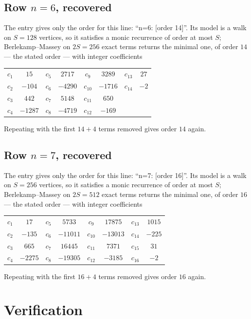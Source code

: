 \documentclass[11pt,a4paper]{article}
\theoremstyle{plain}
\theoremstyle{definition}
\begin{document}
\subsection*{Row $n=6$, recovered}
The entry gives only the order for this line: ``n=6: [order 14]''. Its model is a walk on
$S=128$ vertices, so it satisfies a monic recurrence of order at most $S$;
Berlekamp--Massey on $2S=256$ exact terms returns the minimal one, of order
$14$ --- the stated order --- with integer coefficients
\begin{center}\small\begin{tabular}{cccccccc}
$c_{1}$ & $15$ & $c_{5}$ & $2717$ & $c_{9}$ & $3289$ & $c_{13}$ & $27$ \\
$c_{2}$ & $-104$ & $c_{6}$ & $-4290$ & $c_{10}$ & $-1716$ & $c_{14}$ & $-2$ \\
$c_{3}$ & $442$ & $c_{7}$ & $5148$ & $c_{11}$ & $650$ &  &  \\
$c_{4}$ & $-1287$ & $c_{8}$ & $-4719$ & $c_{12}$ & $-169$ &  &  \\
\end{tabular}\end{center}
Repeating with the first $14+4$ terms removed gives order $14$ again.

\subsection*{Row $n=7$, recovered}
The entry gives only the order for this line: ``n=7: [order 16]''. Its model is a walk on
$S=256$ vertices, so it satisfies a monic recurrence of order at most $S$;
Berlekamp--Massey on $2S=512$ exact terms returns the minimal one, of order
$16$ --- the stated order --- with integer coefficients
\begin{center}\small\begin{tabular}{cccccccc}
$c_{1}$ & $17$ & $c_{5}$ & $5733$ & $c_{9}$ & $17875$ & $c_{13}$ & $1015$ \\
$c_{2}$ & $-135$ & $c_{6}$ & $-11011$ & $c_{10}$ & $-13013$ & $c_{14}$ & $-225$ \\
$c_{3}$ & $665$ & $c_{7}$ & $16445$ & $c_{11}$ & $7371$ & $c_{15}$ & $31$ \\
$c_{4}$ & $-2275$ & $c_{8}$ & $-19305$ & $c_{12}$ & $-3185$ & $c_{16}$ & $-2$ \\
\end{tabular}\end{center}
Repeating with the first $16+4$ terms removed gives order $16$ again.

\section{Verification}
\end{document}
